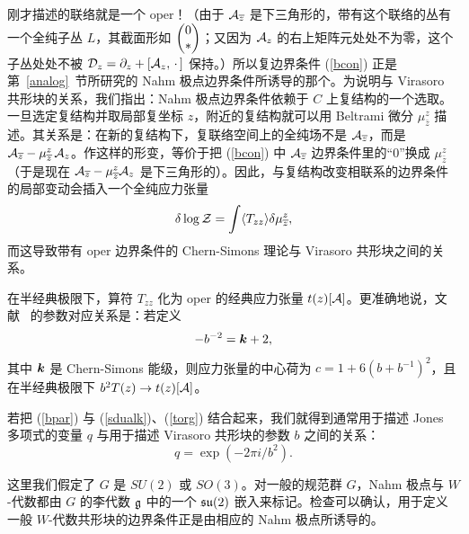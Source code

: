 刚才描述的联络就是一个 oper！（由于 $\A_{\bar z}$ 是下三角形的，带有这个联络的丛有一个全纯子丛 $L$，其截面形如 $\begin{pmatrix}0\cr *\end{pmatrix}$；又因为 $\A_z$ 的右上矩阵元处处不为零，这个子丛处处不被 $\D_z=\partial_z+[\A_z,\,\cdot\,]$ 保持。）所以复边界条件 (\ref{bcon}) 正是第~\ref{analog}~节所研究的 Nahm 极点边界条件所诱导的那个。为说明与 Virasoro 共形块的关系，我们指出：Nahm 极点边界条件依赖于 $C$ 上复结构的一个选取。一旦选定复结构并取局部复坐标 $z$，附近的复结构就可以用 Beltrami 微分 $\mu_{\bar z}^z$ 描述。其关系是：在新的复结构下，复联络空间上的全纯场不是 $\A_{\bar z}$，而是 $\A_{\bar z}-\mu_{\bar z}^z\,\A_z$。作这样的形变，等价于把 (\ref{bcon}) 中 $\A_{\bar z}$ 边界条件里的“$0$”换成 $\mu_{\bar z}^z$（于是现在 $\A_{\bar z}-\mu_{\bar z}^z\A_z$ 是下三角形的）。因此，与复结构改变相联系的边界条件的局部变动会插入一个全纯应力张量
\begin{equation}
\delta \log \cZ = \int \langle T_{zz} \rangle \delta \mu_{\bar z}^z,
\end{equation}
而这导致带有 oper 边界条件的 Chern-Simons 理论与 Virasoro 共形块之间的关系。

在半经典极限下，算符 $T_{zz}$ 化为 oper 的经典应力张量 $\bt(z)[\A]$。更准确地说，文献~\cite{HVerlinde} 的参数对应关系是：若定义
\begin{equation}\label{bpar}-b^{-2} =\k+2,\end{equation}
其中 $\k$ 是 Chern-Simons 能级，则应力张量的中心荷为 $c=1+6(b+b^{-1})^2$，且在半经典极限下 $b^2 T(z) \to \bt(z)[\A]$。

若把 (\ref{bpar}) 与 (\ref{sdualk})、(\ref{torg}) 结合起来，我们就得到通常用于描述 Jones 多项式的变量 $q$ 与用于描述 Virasoro 共形块的参数 $b$ 之间的关系：
\begin{equation}\label{zorg}q=\exp(-2\pi i/b^2).\end{equation}

这里我们假定了 $G$ 是 $SU(2)$ 或 $SO(3)$。对一般的规范群 $G$，Nahm 极点与 $W$-代数都由 $G$ 的李代数 $\frak{g}$ 中的一个 $\frak{su}(2)$ 嵌入来标记。检查可以确认，用于定义一般 $W$-代数共形块的边界条件正是由相应的 Nahm 极点所诱导的。
